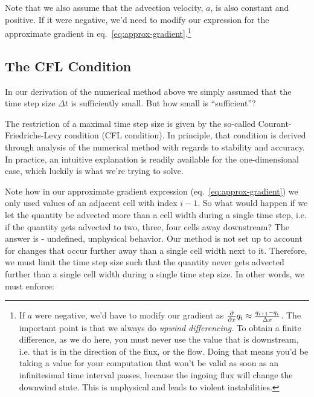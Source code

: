 Note that we also assume that the advection velocity, $a$, is also constant and positive.
If it were negative, we'd need to modify our expression for the approximate gradient in
eq.~\ref{eq:approx-gradient}.\footnote{
	If $a$ were negative, we'd have to modify our gradient as $\frac{\partial}{\partial x}{q_i} \approx \frac{q_{i+1} - q_i}{\Delta x}$.
	The important point is that we always do \emph{upwind differencing}. To obtain a
	finite difference, as we do here, you must never use the value that is downstream,
	i.e. that is in the direction of the flux, or the flow. Doing that means you'd be
	taking a value for your computation that won't be valid as soon as an infinitesimal
	time interval passes, because the ingoing flux will change the downwind state.
	This is unphysical and leads to violent instabilities.
}









\subsection{The CFL Condition}

In our derivation of the numerical method above we simply assumed that the time
step size $\Delta t$ is sufficiently small. But how small is ``sufficient''?

The restriction of a maximal time step size is given by the so-called
Courant-Friedrichs-Levy condition (CFL condition). In principle, that condition
is derived through analysis of the numerical method with regards to stability and
accuracy. In practice, an intuitive explanation is readily available for the one-dimensional
case, which luckily is what we're trying to solve.

Note how in our approximate gradient expression (eq.~\ref{eq:approx-gradient})
we only used values of an adjacent cell with index $i - 1$. So what would happen if
we let the quantity be advected more than a cell width during a single time step, i.e.
if the quantity gets advected to two, three, four cells away downstream? The answer is -
undefined, unphysical behavior. Our method is not set up to account for changes that
occur further away than a single cell width next to it. Therefore, we must limit the
time step size such that the quantity never gets advected further than a single cell width
during a single time step size. In other words, we must enforce:

